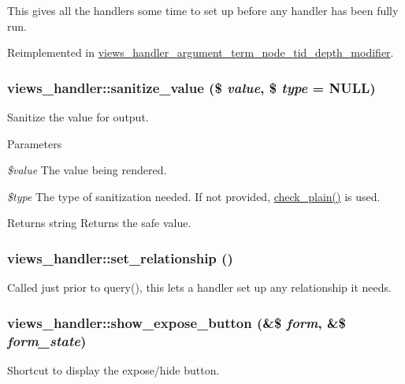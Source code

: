 This gives all the handlers some time to set up before any handler has been fully run. 

Reimplemented in \hyperlink{classviews__handler__argument__term__node__tid__depth__modifier_a278abcb2e424241efa1361d01be89eb1}{views\_\-handler\_\-argument\_\-term\_\-node\_\-tid\_\-depth\_\-modifier}.\hypertarget{classviews__handler_a0e347d00f1270832f88c46705901721e}{
\subsubsection[{sanitize\_\-value}]{\setlength{\rightskip}{0pt plus 5cm}views\_\-handler::sanitize\_\-value (\$ {\em value}, \/  \$ {\em type} = {\ttfamily NULL})}}
\label{classviews__handler_a0e347d00f1270832f88c46705901721e}
Sanitize the value for output.


\begin{DoxyParams}{Parameters}
\item[{\em \$value}]The value being rendered. \item[{\em \$type}]The type of sanitization needed. If not provided, \hyperlink{group__sanitization_ga76fc67a30fd8d75ddd80565e6e65a13d}{check\_\-plain()} is used.\end{DoxyParams}
\begin{DoxyReturn}{Returns}
string Returns the safe value. 
\end{DoxyReturn}
\hypertarget{classviews__handler_ac54ea4553cbc678d23b51dfad3142a54}{
\subsubsection[{set\_\-relationship}]{\setlength{\rightskip}{0pt plus 5cm}views\_\-handler::set\_\-relationship ()}}
\label{classviews__handler_ac54ea4553cbc678d23b51dfad3142a54}
Called just prior to query(), this lets a handler set up any relationship it needs. \hypertarget{classviews__handler_af519db20125fb4d1c0f7401692dcef0c}{
\subsubsection[{show\_\-expose\_\-button}]{\setlength{\rightskip}{0pt plus 5cm}views\_\-handler::show\_\-expose\_\-button (\&\$ {\em form}, \/  \&\$ {\em form\_\-state})}}
\label{classviews__handler_af519db20125fb4d1c0f7401692dcef0c}
Shortcut to display the expose/hide button. 

